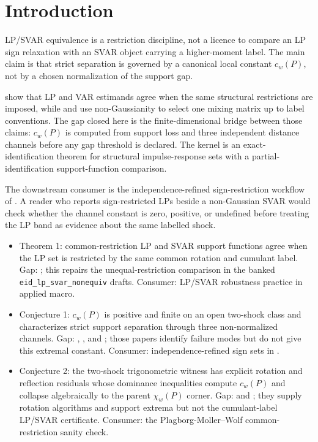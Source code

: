 \documentclass[11pt]{article}
\theoremstyle{definition}
\theoremstyle{plain}
\theoremstyle{remark}
\begin{document}
\section{Introduction}
LP/SVAR equivalence is a restriction discipline, not a licence to compare an LP sign relaxation with an SVAR object carrying a higher-moment label. The main claim is that strict separation is governed by a canonical local constant \(c_w(P)\), not by a chosen normalization of the support gap.

\citet[Sections 2--3]{PlagborgMollerWolf2021} show that LP and VAR estimands agree when the same structural restrictions are imposed, while \citet[Section 2]{GourierouxMonfortRenne2017} and \citet[Section 3]{LanneMeitzSaikkonen2017} use non-Gaussianity to select one mixing matrix up to label conventions. The gap closed here is the finite-dimensional bridge between those claims: \(c_w(P)\) is computed from support loss and three independent distance channels before any gap threshold is declared. The kernel is an exact-identification theorem for structural impulse-response sets with a partial-identification support-function comparison.

The downstream consumer is the independence-refined sign-restriction workflow of \citet{DrautzburgWright2023}. A reader who reports sign-restricted LPs beside a non-Gaussian SVAR would check whether the channel constant is zero, positive, or undefined before treating the LP band as evidence about the same labelled shock.

\begin{itemize}[leftmargin=*]
\item Theorem 1: common-restriction LP and SVAR support functions agree when the LP set is restricted by the same common rotation and cumulant label. Gap: \citet{PlagborgMollerWolf2021}; this repairs the unequal-restriction comparison in the banked \texttt{eid\_lp\_svar\_nonequiv} drafts. Consumer: LP/SVAR robustness practice in applied macro.
\item Conjecture 1: \(c_w(P)\) is positive and finite on an open two-shock class and characterizes strict support separation through three non-normalized channels. Gap: \citet{Wolf2022}, \citet{Read2022UnitEffect}, and \citet{DrautzburgWright2023}; those papers identify failure modes but do not give this extremal constant. Consumer: independence-refined sign sets in \citet{DrautzburgWright2023}.
\item Conjecture 2: the two-shock trigonometric witness has explicit rotation and reflection residuals whose dominance inequalities compute \(c_w(P)\) and collapse algebraically to the parent \(\chi_w(P)\) corner. Gap: \citet{Read2022SignZero} and \citet{GafarovMeierMontielOlea2018}; they supply rotation algorithms and support extrema but not the cumulant-label LP/SVAR certificate. Consumer: the Plagborg-Moller--Wolf common-restriction sanity check.
\end{itemize}
\end{document}
